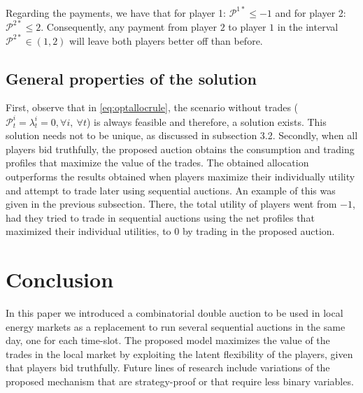 \documentclass[runningheads]{llncs}
\newcommand{\pri}[1][]{\lambda^i_{#1}}
\newcommand{\gaini}[1][]{\mathcal{P}^i_{#1}}
\begin{document}
Regarding the payments, we have that for player 1: 
$\mathcal{P}^{1*} \leq -1$ and for player 2: $\mathcal{P}^{2*} \leq 2$.
Consequently, any payment from player $2$ to player $1$ in the interval $\mathcal{P}^{2*} \in (1, 2)$ will leave both players better off than before. 



\subsection{General properties of the solution}

First, observe that in \eqref{eq:optallocrule}, the scenario without trades ($\gaini[t] = \pri[t] = 0, \forall i, \ \forall t$) is always feasible and therefore, a solution exists. This solution needs not to be unique, as discussed in subsection 3.2.
Secondly, when all players bid truthfully, the proposed auction obtains the consumption and trading profiles that maximize the value of the trades. The obtained allocation outperforms the results obtained when players maximize their individually utility and attempt to trade later using sequential auctions. An example of this was given in the previous subsection. There, the total utility of players went from $-1$, had they tried to trade in sequential auctions using the net profiles that maximized their individual utilities, to $0$ by trading in the proposed auction.


\section{Conclusion}

In this paper we introduced a combinatorial double auction to be used in local energy markets as a replacement to run several sequential auctions in the same day, one for each time-slot. The proposed model maximizes the value of the trades in the local market by exploiting the latent flexibility of the players, given that players bid truthfully.
Future lines of research include variations of the proposed mechanism that are strategy-proof or that require less binary variables.


%
%


%
\end{document}
